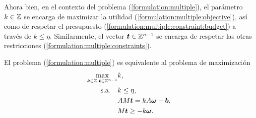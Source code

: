 Ahora bien, en el contexto del problema (\ref{formulation:multiple}), el parámetro $k \in \mathbb{Z}$ se
encarga de maximizar la utilidad (\ref{formulation:multiple:objective}), así como de respetar el
presupuesto (\ref{formulation:multiple:constraint:budget}) a través de $k \leq \eta$. Similarmente,
el vector $\boldsymbol{t} \in \mathbb{Z}^{n-1}$ se encarga de respetar las otras restricciones
(\ref{formulation:multiple:constraints}).
\begin{theorem}
	El problema (\ref{formulation:multiple}) es equivalente al problema de maximización
	\begin{subequations}
		\label{formulation:lattice}
		\begin{align}
			\max_{k \in \mathbb{Z}, \boldsymbol{t} \in \mathbb{Z}^{n-1}}
				& k, \\
			\text{s.a.} \quad
				& k \leq \eta, \label{lattice:c-layer} \\
				& AM\boldsymbol{t} = kA\boldsymbol{\omega} - \boldsymbol{b}, \label{lattice:constraints} \\
				& M\boldsymbol{t} \geq -k\boldsymbol{\omega}.
		\end{align}
	\end{subequations}
\end{theorem}
